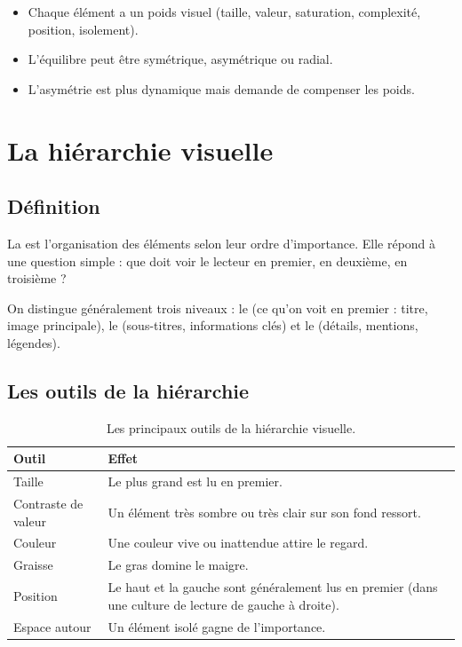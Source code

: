 \begin{retenir}
\begin{itemize}
  \item Chaque élément a un poids visuel (taille, valeur, saturation, complexité, position, isolement).
  \item L'équilibre peut être symétrique, asymétrique ou radial.
  \item L'asymétrie est plus dynamique mais demande de compenser les poids.
\end{itemize}
\end{retenir}

\section{La hiérarchie visuelle}

\subsection{Définition}

La  est l'organisation des éléments selon leur ordre d'importance. Elle répond à une question simple : que doit voir le lecteur en premier, en deuxième, en troisième ?

\begin{defbox}
On distingue généralement trois niveaux : le  (ce qu'on voit en premier : titre, image principale), le  (sous-titres, informations clés) et le  (détails, mentions, légendes).
\end{defbox}

\subsection{Les outils de la hiérarchie}

\begin{table}[h!]
\centering
\begin{tabular}{@{}p{3.5cm}p{10.5cm}@{}}
\toprule
\textbf{Outil} & \textbf{Effet} \\
\midrule
Taille & Le plus grand est lu en premier. \\
Contraste de valeur & Un élément très sombre ou très clair sur son fond ressort. \\
Couleur & Une couleur vive ou inattendue attire le regard. \\
Graisse & Le gras domine le maigre. \\
Position & Le haut et la gauche sont généralement lus en premier (dans une culture de lecture de gauche à droite). \\
Espace autour & Un élément isolé gagne de l'importance. \\
\bottomrule
\end{tabular}
\caption{Les principaux outils de la hiérarchie visuelle.}
\end{table}

